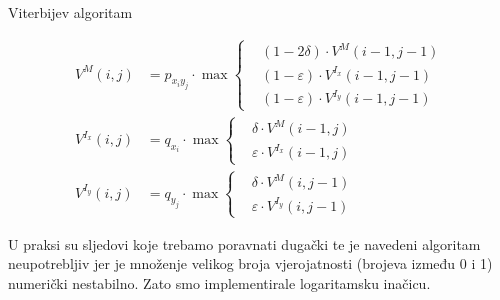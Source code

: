 \documentclass[times, utf8, seminar, numeric]{fer}
\begin{document}
\begin{algorithm}[H]
		\caption{Viterbijev algoritam}
	\label{alg:viterbi}
	\begin{align*}
		V^{M}(i, j) &= p_{x_{i} y_{j}} \cdot \max \left\{ \begin{aligned}
			&(1 - 2\delta) \cdot V^{M}(i - 1, j - 1) \\
			&(1 - \varepsilon) \cdot V^{I_x}(i - 1, j - 1) \\
			&(1 - \varepsilon) \cdot V^{I_y}(i - 1, j - 1)
		\end{aligned}  \\
		V^{I_x}(i, j) &= q_{x_{i}} \cdot \max \left\{ \begin{aligned}
			&\delta \cdot V^{M}(i - 1, j) \\
			&\varepsilon \cdot V^{I_x}(i - 1, j)
		\end{aligned}  \\
		V^{I_y}(i, j) &= q_{y_{j}} \cdot \max \left\{ \begin{aligned}
			&\delta \cdot V^{M}(i, j - 1) \\
			&\varepsilon \cdot V^{I_y}(i, j - 1)
		\end{aligned} 
	\end{align*}
\end{algorithm}

U praksi su sljedovi koje trebamo poravnati dugački te je navedeni algoritam neupotrebljiv jer je množenje velikog broja vjerojatnosti (brojeva između 0 i 1) numerički nestabilno. Zato smo implementirale logaritamsku inačicu.
\end{document}
